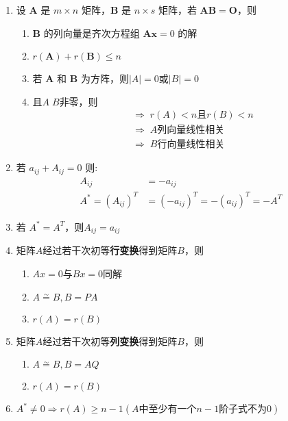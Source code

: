 \documentclass[a4paper,12pt]{article}
\begin{document}
    \begin{enumerate}
        \item 设 $\mathbf{A}$ 是 $m \times n$ 矩阵，$\mathbf{B}$ 是 $n \times s$ 矩阵，若 $\mathbf{AB} = \mathbf{O}$，则
        \begin{enumerate}
            \item $\mathbf{B}$ 的列向量是齐次方程组 $\mathbf{Ax} = 0$ 的解
            \item $r(\mathbf{A}) + r(\mathbf{B}) \le n$
            \item 若 $\mathbf{A}$ 和 $\mathbf{B}$ 为方阵，则$|A| = 0$或$|B| = 0$
            \item 且$A\;B$非零，则
            \begin{align*}
                &\Rightarrow\; r(A) < n\text{且}r(B) < n \\
                &\Rightarrow\; A\text{列向量线性相关} \\
                &\Rightarrow\; B\text{行向量线性相关}
            \end{align*}
        \end{enumerate}
        \item 若 $a_{ij} + A_{ij} = 0$ 则:
        \[
            \begin{aligned}
                A_{ij} &= -a_{ij} \\
                A^* = (A_{ij})^T &= (-a_{ij})^T = -(a_{ij})^T = -A^T
            \end{aligned}
        \]
        \item 若 $A^* = A^T$，则$A_{ij} = a_{ij}$
        \item 矩阵$A$经过若干次初等\textbf{行变换}得到矩阵$B$，则
        \begin{enumerate}
            \item $Ax = 0$与$Bx = 0$同解
            \item $A \overset{\sim}{=} B, B = PA$
            \item $r(A) = r(B)$
        \end{enumerate}
        \item 矩阵$A$经过若干次初等\textbf{列变换}得到矩阵$B$，则
        \begin{enumerate}
            \item $A \overset{\sim}{=} B, B = AQ$
            \item $r(A) = r(B)$
        \end{enumerate}
        \item $A^* \neq 0 \Rightarrow r(A) \ge n - 1(A\text{中至少有一个}n-1\text{阶子式不为0})$

\end{enumerate}
\end{document}
